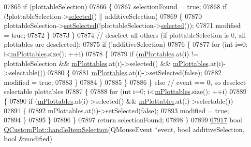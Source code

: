 \begin{DoxyCode}
07865     \textcolor{keywordflow}{if} (plottableSelection)
07866     \{
07867       selectionFound = \textcolor{keyword}{true};
07868       \textcolor{keywordflow}{if} (!plottableSelection->\hyperlink{a00024_ab901903adcb0e29467d63de72340ab29}{selected}() || additiveSelection)
07869       \{
07870         plottableSelection->\hyperlink{a00024_afbd5428c2952f59d952e11ab5cd79176}{setSelected}(!plottableSelection->\hyperlink{a00024_ab901903adcb0e29467d63de72340ab29}{selected}());
07871         modified = \textcolor{keyword}{true};
07872       \}
07873     \}
07874     \textcolor{comment}{// deselect all others (if plottableSelection is 0, all plottables are deselected):}
07875     \textcolor{keywordflow}{if} (!additiveSelection)
07876     \{
07877       \textcolor{keywordflow}{for} (\textcolor{keywordtype}{int} i=0; i<\hyperlink{a00116_a57ed6eb2e0a767a8344de45110a3e81d}{mPlottables}.size(); ++i)
07878       \{
07879         \textcolor{keywordflow}{if} (\hyperlink{a00116_a57ed6eb2e0a767a8344de45110a3e81d}{mPlottables}.at(i) != plottableSelection && \hyperlink{a00116_a57ed6eb2e0a767a8344de45110a3e81d}{mPlottables}.at(i)->selected() 
      && \hyperlink{a00116_a57ed6eb2e0a767a8344de45110a3e81d}{mPlottables}.at(i)->selectable())
07880         \{
07881           \hyperlink{a00116_a57ed6eb2e0a767a8344de45110a3e81d}{mPlottables}.at(i)->setSelected(\textcolor{keyword}{false});
07882           modified = \textcolor{keyword}{true};
07883         \}
07884       \}
07885     \}
07886   \} \textcolor{keywordflow}{else} \textcolor{comment}{// event == 0, so deselect selectable plottables}
07887   \{
07888     \textcolor{keywordflow}{for} (\textcolor{keywordtype}{int} i=0; i<\hyperlink{a00116_a57ed6eb2e0a767a8344de45110a3e81d}{mPlottables}.size(); ++i)
07889     \{
07890       \textcolor{keywordflow}{if} (\hyperlink{a00116_a57ed6eb2e0a767a8344de45110a3e81d}{mPlottables}.at(i)->selected() && \hyperlink{a00116_a57ed6eb2e0a767a8344de45110a3e81d}{mPlottables}.at(i)->selectable())
07891       \{
07892         \hyperlink{a00116_a57ed6eb2e0a767a8344de45110a3e81d}{mPlottables}.at(i)->setSelected(\textcolor{keyword}{false});
07893         modified = \textcolor{keyword}{true};
07894       \}
07895     \}
07896   \}
07897   \textcolor{keywordflow}{return} selectionFound;
07898 \}
07899 
\hypertarget{a00115_source_l07917}{}\hyperlink{a00116_aa1ad9839539b4cdf9f7da768336650f2}{07917} \textcolor{keywordtype}{bool} \hyperlink{a00116_aa1ad9839539b4cdf9f7da768336650f2}{QCustomPlot::handleItemSelection}(QMouseEvent *event, \textcolor{keywordtype}{bool} 
      additiveSelection, \textcolor{keywordtype}{bool} &modified)

\end{DoxyCode}
